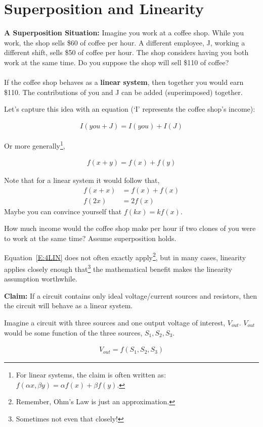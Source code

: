 \section{Superposition and Linearity}
\textbf{A Superposition Situation:} Imagine you work at a coffee shop. While you work, the shop sells \$60 of coffee per hour. A different employee, J, working a different shift, sells \$50 of coffee per hour. The shop considers having you both work at the same time. Do you suppose the shop will sell \$110 of coffee?\\
\\
If the coffee shop behaves as a \textbf{linear system}, then together you would earn \$110. The contributions of you and J can be added (superimposed) together.
\par
Let's capture this idea with an equation (`I' represents the coffee shop's income):

\begin{align*}
I(you+J) = I(you)+I(J)
\end{align*}

Or more generally\footnote{For linear systems, the claim is often written as: $f(\alpha x,\beta y) = \alpha f(x)+\beta f(y)$.},

\begin{align}
f(x+y) = f(x)+f(y) \label{E:4LIN}
\end{align}

Note that for a linear system it would follow that, 
\begin{align*}
f(x+x) &= f(x)+f(x) \\
f(2x)&=2f(x)
\end{align*}
Maybe you can convince yourself that $f(kx)=kf(x)$.\par

\begin{alevel}
How much income would the coffee shop make per hour if two clones of you were to work at the same time? Assume superposition holds.
\end{alevel}

\vspace{5mm}


Equation~\eqref{E:4LIN} does not often exactly apply\footnote{Remember, Ohm's Law is just an approximation.}, but in many cases, linearity applies closely enough that\footnote{Sometimes not even that closely!} the mathematical benefit makes the linearity assumption worthwhile.
\par
\textbf{Claim:} If a circuit contains only ideal voltage/current sources and resistors, then the circuit will behave as a linear system. \par
Imagine a circuit with three sources and one output voltage of interest, $V_{out}$. $V_{out}$ would be some function of the three sources, $S_1,S_2,S_3$.
\par
\begin{align}
V_{out} = f(S_1,S_2,S_3)
\end{align}

